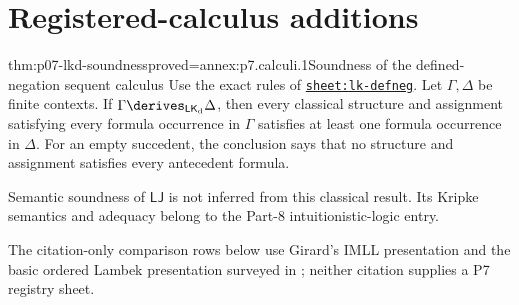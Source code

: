
\section{Registered-calculus additions}

\begin{hbtheorem}{thm:p07-lkd-soundness}{proved=annex:p7.calculi.1}{Soundness of the defined-negation sequent calculus}
Use the exact rules of \hyperref[sheet:lk-defneg]{\texttt{sheet:lk-defneg}}.
Let \(\Gamma,\Delta\) be finite contexts.  If
\(\Gamma\derives_{\mathsf{LK}_{\mathrm d}}\Delta\), then every
classical structure and assignment satisfying every formula occurrence in
\(\Gamma\) satisfies at least one formula occurrence in \(\Delta\).  For an
empty succedent, the conclusion says that no structure and assignment
satisfies every antecedent formula.
\end{hbtheorem}

Semantic soundness of \(\mathsf{LJ}\) is not inferred from this classical
result.  Its Kripke semantics and adequacy belong to the Part-8
intuitionistic-logic entry.

The citation-only comparison rows below use Girard's IMLL presentation
\cite{Girard1987} and the basic ordered Lambek presentation surveyed in
\cite{GalatosJipsenKowalskiOno2007}; neither citation supplies a P7 registry
sheet.


